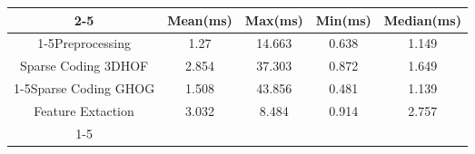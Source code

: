 \documentclass{standalone}
\begin{document}
 
 \begin{tabular}{|c |c |c |c |c |}
\cline{2-5}\cline{2-5} \multicolumn{1}{c |}{ } & Mean(ms) & Max(ms) & Min(ms) & Median(ms)\\ 
\cline{1-5}Preprocessing & 1.27 & 14.663 & 0.638 & 1.149\\ 
 \hhline{|=|=|=|=|=|}Sparse Coding 3DHOF & 2.854 & 37.303 & 0.872 & 1.649\\ 
 \cline{1-5}Sparse Coding GHOG & 1.508 & 43.856 & 0.481 & 1.139\\ 
 \hhline{|=|=|=|=|=|}Feature Extaction & 3.032 & 8.484 & 0.914 & 2.757\\ 
 \cline{1-5}\hline \end{tabular}
 
\end{document}
